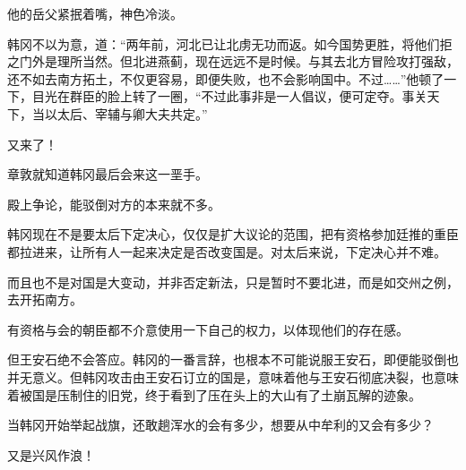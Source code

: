 他的岳父紧抿着嘴，神色冷淡。

韩冈不以为意，道：“两年前，河北已让北虏无功而返。如今国势更胜，将他们拒之门外是理所当然。但北进燕蓟，现在远远不是时候。与其去北方冒险攻打强敌，还不如去南方拓土，不仅更容易，即便失败，也不会影响国中。不过……”他顿了一下，目光在群臣的脸上转了一圈，“不过此事非是一人倡议，便可定夺。事关天下，当以太后、宰辅与卿大夫共定。”

又来了！

章敦就知道韩冈最后会来这一垩手。

殿上争论，能驳倒对方的本来就不多。

韩冈现在不是要太后下定决心，仅仅是扩大议论的范围，把有资格参加廷推的重臣都拉进来，让所有人一起来决定是否改变国是。对太后来说，下定决心并不难。

而且也不是对国是大变动，并非否定新法，只是暂时不要北进，而是如交州之例，去开拓南方。

有资格与会的朝臣都不介意使用一下自己的权力，以体现他们的存在感。

但王安石绝不会答应。韩冈的一番言辞，也根本不可能说服王安石，即便能驳倒也并无意义。但韩冈攻击由王安石订立的国是，意味着他与王安石彻底决裂，也意味着被国是压制住的旧党，终于看到了压在头上的大山有了土崩瓦解的迹象。

当韩冈开始举起战旗，还敢趟浑水的会有多少，想要从中牟利的又会有多少？

又是兴风作浪！
